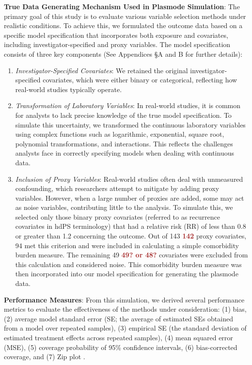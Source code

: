 \documentclass[sn-vancouver,Numbered,lineno,pdflatex]{sn-jnl}
\begin{document}
\textbf{True Data Generating Mechanism Used in Plasmode Simulation}: The
primary goal of this study is to evaluate various variable selection
methods under realistic conditions. To achieve this, we formulated the
outcome data based on a specific model specification that incorporates
both exposure and covariates, including investigator-specified and proxy
variables. The model specification consists of three key components (See
Appendices \S A and B for further details):

\begin{enumerate}
\def\labelenumi{\arabic{enumi}.}
\item
  \emph{Investigator-Specified Covariates}: We retained the original
  investigator-specified covariates, which were either binary or
  categorical, reflecting how real-world studies typically operate.
\item
  \emph{Transformation of Laboratory Variables}: In real-world studies,
  it is common for analysts to lack precise knowledge of the true model
  specification. To simulate this uncertainty, we transformed the
  continuous laboratory variables using complex functions such as
  logarithmic, exponential, square root, polynomial transformations, and
  interactions. This reflects the challenges analysts face in correctly
  specifying models when dealing with continuous data.
\item
  \emph{Inclusion of Proxy Variables}: Real-world studies often deal
  with unmeasured confounding, which researchers attempt to mitigate by
  adding proxy variables. However, when a large number of proxies are
  added, some may act as noise variables, contributing little to the
  analysis. To simulate this, we selected only those binary proxy
  covariates (referred to as recurrence covariates in hdPS terminology)
  that had a relative risk (RR) of less than 0.8 or greater than 1.2
  concerning the outcome. Out of 143 \textcolor{brown}{\textbf{142}}
  proxy covariates, 94 met this criterion and were included in
  calculating a simple comorbidity burden measure. The remaining 49
  \textcolor{brown}{\textbf{49? or 48?}} covariates were excluded from
  this calculation and considered noise. This comorbidity burden measure
  was then incorporated into our model specification for generating the
  plasmode data.
\end{enumerate}

\textbf{Performance Measures}: From this simulation, we derived several
performance metrics to evaluate the effectiveness of the methods under
consideration: (1) bias, (2) average model standard error (SE; the
average of estimated SEs obtained from a model over repeated samples),
(3) empirical SE (the standard deviation of estimated treatment effects
across repeated samples), (4) mean squared error (MSE), (5) coverage
probability of 95\% confidence intervals, (6) bias-corrected coverage,
and (7) Zip plot \citep{morris2019using, white2023check}.
\end{document}

